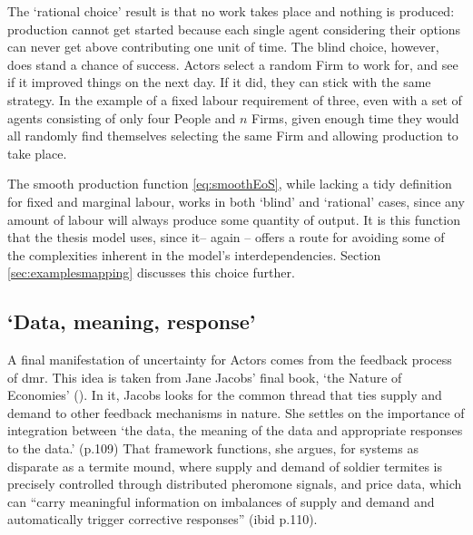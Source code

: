 {The `rational choice' result is that no work takes place and nothing is produced: production cannot get started because each single agent considering their options can never get above contributing one unit of time.  The blind choice, however, does stand a chance of success. Actors select a random Firm to work for, and see if it improved things on the next day. If it did, they can stick with the same strategy. In the example of a fixed labour requirement of three, even with a set of agents consisting of only four People and $n$ Firms, given enough time they would all randomly find themselves selecting the same Firm and allowing production to take place.

The smooth production function \eqref{eq:smoothEoS}, while lacking a tidy definition for fixed and marginal labour, works in both `blind' and `rational' cases, since any amount of labour will always produce some quantity of output. It is this function that the thesis model uses, since it– again – offers a route for avoiding some of the complexities inherent in the model's interdependencies. Section \ref{sec:examplesmapping} discusses this choice further.


\subsection{`Data, meaning, response' \label{sec:dmr}}


A final manifestation of uncertainty for Actors comes from the feedback process of \gls{dmr}. This idea is taken from Jane Jacobs' final book, `the Nature of Economies' (\citealt{jacobs_nature_2001}). In it, Jacobs looks for the common thread that ties supply and demand to other feedback mechanisms in nature. She settles on the importance of integration between `the data, the meaning of the data and appropriate responses to the data.' (p.109) That framework functions, she argues, for systems as disparate as a termite mound, where supply and demand of soldier termites is precisely controlled through distributed pheromone signals, and price data, which can ``carry meaningful information on imbalances of supply and demand and automatically trigger corrective responses'' (ibid p.110). 

}
